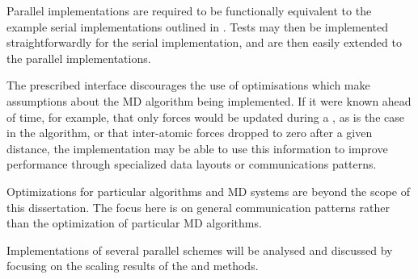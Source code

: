 Parallel implementations are required to be functionally equivalent
to the example serial implementations outlined in .
%
Tests may then be implemented straightforwardly for the serial implementation,
and are then easily extended to the parallel implementations.

The prescribed interface discourages the use of optimisations which make
assumptions about the MD algorithm being implemented.
%
If it were known ahead of time, for example, that
only forces would be updated during a \pairoperation{},
as is the case in the \velocityverlet{} algorithm,
or that inter-atomic forces dropped to zero after a given distance,
the implementation may be able to use this information to improve
performance through specialized data layouts or communications patterns.

Optimizations for particular algorithms and MD systems are
beyond the scope of this dissertation.
%
The focus here is on general communication patterns rather than
the optimization of particular MD algorithms.

Implementations of several parallel schemes
will be analysed and discussed by focusing on
the scaling results of the \individualoperation{} and \pairoperation{} methods.
